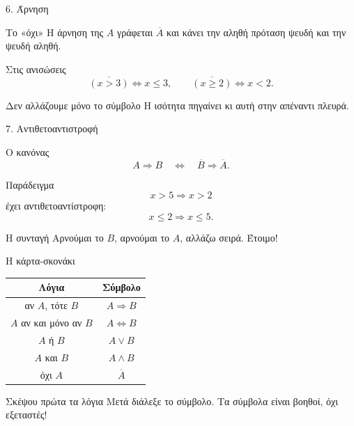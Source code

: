 \documentclass{presentation}
\begin{document}
\begin{frame}{6. Άρνηση}
  \begin{block}{Το «όχι»}
    Η άρνηση της $A$ γράφεται $\overline{A}$ και κάνει την αληθή πρόταση ψευδή
    και την ψευδή αληθή.
  \end{block}

  \begin{exampleblock}{Στις ανισώσεις}
    \[
      \overline{(x>3)}\Leftrightarrow x\le3,
      \qquad
      \overline{(x\ge2)}\Leftrightarrow x<2.
    \]
  \end{exampleblock}

  \begin{alertblock}{Δεν αλλάζουμε μόνο το σύμβολο}
    Η ισότητα πηγαίνει κι αυτή στην απέναντι πλευρά.
  \end{alertblock}
\end{frame}

\begin{frame}{7. Αντιθετοαντιστροφή}
  \begin{block}{Ο κανόνας}
    \[
      A\Rightarrow B
      \quad\Longleftrightarrow\quad
      \overline{B}\Rightarrow\overline{A}.
    \]
  \end{block}

  \begin{exampleblock}{Παράδειγμα}
    \[
      x>5\Rightarrow x>2
    \]
    έχει αντιθετοαντίστροφη:
    \[
      x\le2\Rightarrow x\le5.
    \]
  \end{exampleblock}

  \begin{alertblock}{Η συνταγή}
    Αρνούμαι το $B$, αρνούμαι το $A$, αλλάζω σειρά. Έτοιμο!
  \end{alertblock}
\end{frame}

\begin{frame}{Η κάρτα-σκονάκι}
  \begin{center}
    \begin{tabular}{c|c}
      Λόγια & Σύμβολο\\ \hline
      αν $A$, τότε $B$ & $A\Rightarrow B$\\
      $A$ αν και μόνο αν $B$ & $A\Leftrightarrow B$\\
      $A$ ή $B$ & $A\vee B$\\
      $A$ και $B$ & $A\wedge B$\\
      όχι $A$ & $\overline{A}$
    \end{tabular}
  \end{center}

  \begin{block}{Σκέψου πρώτα τα λόγια}
    Μετά διάλεξε το σύμβολο. Τα σύμβολα είναι βοηθοί, όχι εξεταστές!
  \end{block}
\end{frame}
\end{document}
